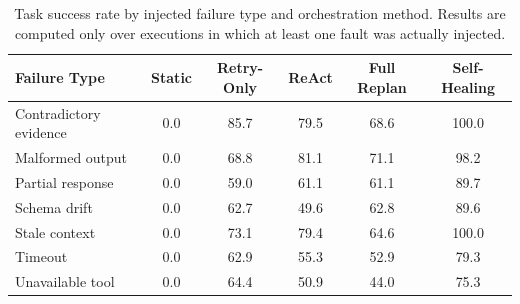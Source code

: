 \begin{table}[H]
\centering
\caption{Task success rate by injected failure type and orchestration method. Results are computed only over executions in which at least one fault was actually injected.}
\label{tab:failure_type_results}
\footnotesize
\setlength{\tabcolsep}{4.5pt}
\begin{tabular}{lccccc}
\toprule
\textbf{Failure Type} & \textbf{Static} & \textbf{Retry-Only} & \textbf{ReAct} & \textbf{Full Replan} & \textbf{Self-Healing} \\
\midrule
Contradictory evidence & 0.0 & 85.7 & 79.5 & 68.6 & 100.0 \\
Malformed output & 0.0 & 68.8 & 81.1 & 71.1 & 98.2 \\
Partial response & 0.0 & 59.0 & 61.1 & 61.1 & 89.7 \\
Schema drift & 0.0 & 62.7 & 49.6 & 62.8 & 89.6 \\
Stale context & 0.0 & 73.1 & 79.4 & 64.6 & 100.0 \\
Timeout & 0.0 & 62.9 & 55.3 & 52.9 & 79.3 \\
Unavailable tool & 0.0 & 64.4 & 50.9 & 44.0 & 75.3 \\
\bottomrule
\end{tabular}
\end{table}
